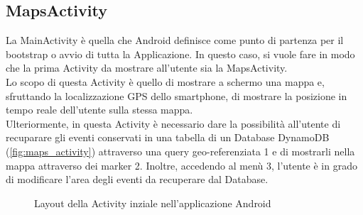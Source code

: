 \subsection{MapsActivity}
La MainActivity è quella che Android definisce come punto di partenza per il bootstrap o avvio di tutta la Applicazione. In questo caso, si vuole fare in modo che la prima Activity da mostrare all'utente sia la MapsActivity.\\
Lo scopo di questa Activity è quello di mostrare a schermo una mappa e, sfruttando la localizzazione GPS dello smartphone, di mostrare la posizione in tempo reale dell'utente sulla stessa mappa.\\
Ulteriormente, in questa Activity è necessario dare la possibilità all'utente di recuparare gli eventi conservati in una tabella di un Database DynamoDB (\autoref{fig:maps_activity}) attraverso una query geo-referenziata \textcolor{mypink}{1} e di mostrarli nella mappa attraverso dei marker \textcolor{mypink}{2}. Inoltre, accedendo al menù \textcolor{mypink}{3}, l'utente è in grado di modificare l'area degli eventi da recuperare dal Database.
\begin{figure}%
	\centering
	\qquad
	\caption{Layout della Activity inziale nell'applicazione Android}%
	\label{fig:maps_activity}%
\end{figure}

